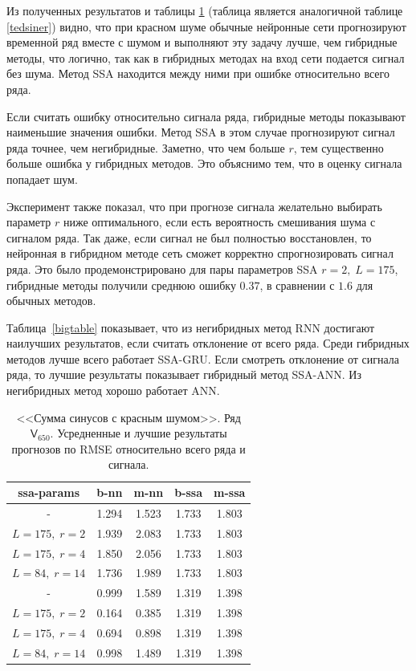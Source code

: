 \documentclass[specialist,
               substylefile = spbu.rtx,
               subf,href,colorlinks=true, 12p]{disser}
\begin{document}
Из полученных результатов и таблицы \ref{tserr} (таблица является аналогичной таблице \ref{tedsiner}) видно, что при красном шуме обычные нейронные сети прогнозируют временной ряд вместе с шумом и выполняют эту задачу лучше, чем гибридные методы, что логично, так как в гибридных методах на вход сети подается сигнал без шума. Метод SSA находится между ними при ошибке относительно всего ряда.

Если считать ошибку относительно сигнала ряда, гибридные методы показывают наименьшие значения ошибки. Метод SSA в этом случае прогнозируют сигнал ряда точнее, чем негибридные. Заметно, что чем больше $r$, тем существенно больше ошибка у гибридных методов. Это объяснимо тем, что в оценку сигнала попадает шум.

Эксперимент также показал, что при прогнозе сигнала желательно выбирать параметр $r$ ниже оптимального, если есть вероятность смешивания шума с сигналом ряда. Так даже, если сигнал не был полностью восстановлен, то нейронная в гибридном методе сеть сможет корректно спрогнозировать сигнал ряда. Это было продемонстрировано для пары параметров SSA $r = 2, \; L = 175$, гибридные методы получили среднюю ошибку $0.37$, в сравнении с $1.6$ для обычных методов.

Таблица~\ref{bigtable} показывает, что из негибридных метод RNN достигают наилучших результатов, если считать отклонение от всего ряда. Среди гибридных методов лучше всего работает SSA-GRU. Если смотреть отклонение от сигнала ряда, то лучшие результаты показывает гибридный метод SSA-ANN. Из негибридных метод хорошо работает ANN.

\begin{table}[h]
	\captionsetup{justification=centering}
	\caption{<<Сумма синусов с красным шумом>>. Ряд $\mathsf{V}_{650}$. Усредненные и лучшие результаты прогнозов по RMSE относительно всего ряда и сигнала.}
	\begin{center}
		\begin{tabular}{ccccc}
			\toprule
			{ssa-params} &  b-nn &  m-nn &  b-ssa &  m-ssa \\
			\midrule
			-          & 1.294 & 1.523 &  1.733 &  1.803 \\
			$L = 175, \; r = 2$       & 1.939 & 2.083 &  1.733 &  1.803 \\
			$L = 175, \; r = 4$       & 1.850 & 2.056 &  1.733 &  1.803 \\
			$L = 84, \; r = 14$     & 1.736 & 1.989 &  1.733 &  1.803 \\
			\midrule
			-          & 0.999 & 1.589 &  1.319 &  1.398 \\
			$L = 175, \; r = 2$       & 0.164 & 0.385 &  1.319 &  1.398 \\
			$L = 175, \; r = 4$       & 0.694 & 0.898 &  1.319 &  1.398 \\
			$L = 84, \; r = 14$     & 0.998 & 1.489 &  1.319 &  1.398 \\
			\bottomrule
		\end{tabular}
	\end{center}
	\label{tserr}
\end{table}
\end{document}
